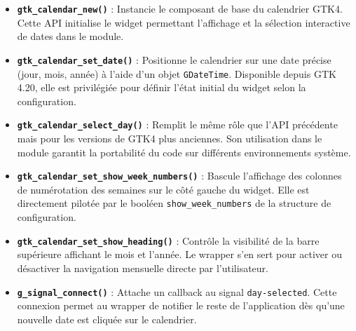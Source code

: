 \begin{itemize}
    \item \textbf{\texttt{gtk\_calendar\_new()}} : Instancie le composant de base du calendrier GTK4. Cette API initialise le widget permettant l'affichage et la sélection interactive de dates dans le module.
    \item \textbf{\texttt{gtk\_calendar\_set\_date()}} : Positionne le calendrier sur une date précise (jour, mois, année) à l'aide d'un objet \texttt{GDateTime}. Disponible depuis GTK 4.20, elle est privilégiée pour définir l'état initial du widget selon la configuration.
    \item \textbf{\texttt{gtk\_calendar\_select\_day()}} : Remplit le même rôle que l'API précédente mais pour les versions de GTK4 plus anciennes. Son utilisation dans le module garantit la portabilité du code sur différents environnements système.
    \item \textbf{\texttt{gtk\_calendar\_set\_show\_week\_numbers()}} : Bascule l'affichage des colonnes de numérotation des semaines sur le côté gauche du widget. Elle est directement pilotée par le booléen \texttt{show\_week\_numbers} de la structure de configuration.
    \item \textbf{\texttt{gtk\_calendar\_set\_show\_heading()}} : Contrôle la visibilité de la barre supérieure affichant le mois et l'année. Le wrapper s'en sert pour activer ou désactiver la navigation mensuelle directe par l'utilisateur.
    \item \textbf{\texttt{g\_signal\_connect()}} : Attache un callback au signal \texttt{day-selected}. Cette connexion permet au wrapper de notifier le reste de l'application dès qu'une nouvelle date est cliquée sur le calendrier.
\end{itemize}

\newpage
